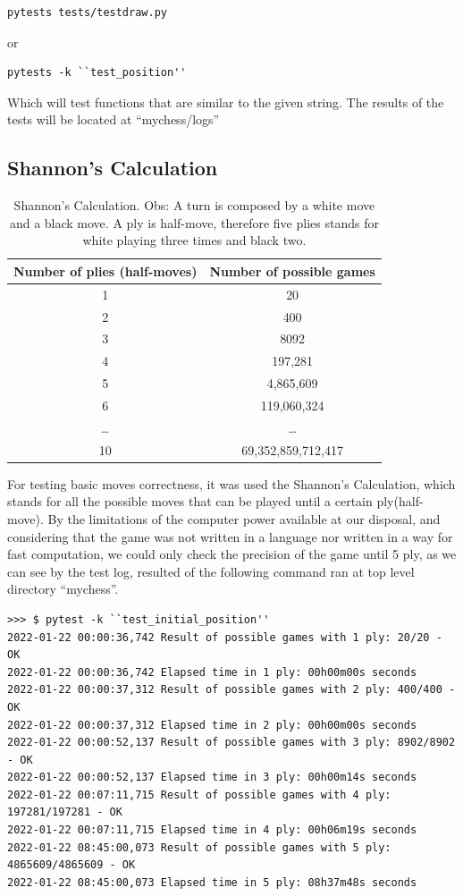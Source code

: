 \documentclass[10pt]{article}
\begin{document}
\begin{lstlisting}
pytests tests/testdraw.py
\end{lstlisting}

or 


\begin{lstlisting}
pytests -k ``test_position''
\end{lstlisting}

Which will test functions that are similar to the given string. The results
of the tests will be located at ``mychess/logs''


\subsection{Shannon's Calculation}


\begin{table}[H]
\center
\begin{tabular}{|c|c|}
\hline
\textbf{Number of plies (half-moves)}  & \textbf{Number of possible games}  \\
\hline
  1   & 20 \\
\hline
   2  &  400 \\
\hline
  3   & 8092 \\
\hline
4  & 197,281 \\
\hline
5   & 4,865,609 \\
\hline
6   & 119,060,324 \\
\hline
\ldots & \ldots \\
\hline
10 & 69,352,859,712,417 \\
\hline
\end{tabular}
\caption{Shannon's Calculation. Obs: A turn is composed by a white move and a
    black move. A ply is half-move, therefore five plies
stands for white playing three times and black two.}
\end{table}

For testing basic moves correctness, it was used the Shannon's Calculation,
which stands for all the possible moves that can be played until a certain
ply(half-move). By the limitations of the computer power available at our
disposal, and considering that the game was not written in a language nor
written in a way for fast computation, we could only check the precision of the
game until 5 ply, as we can see by the test log, resulted of the following
command ran at top level directory ``mychess''.
\begin{lstlisting}
>>> $ pytest -k ``test_initial_position''
2022-01-22 00:00:36,742 Result of possible games with 1 ply: 20/20 - OK
2022-01-22 00:00:36,742 Elapsed time in 1 ply: 00h00m00s seconds
2022-01-22 00:00:37,312 Result of possible games with 2 ply: 400/400 - OK
2022-01-22 00:00:37,312 Elapsed time in 2 ply: 00h00m00s seconds
2022-01-22 00:00:52,137 Result of possible games with 3 ply: 8902/8902 - OK
2022-01-22 00:00:52,137 Elapsed time in 3 ply: 00h00m14s seconds
2022-01-22 00:07:11,715 Result of possible games with 4 ply: 197281/197281 - OK
2022-01-22 00:07:11,715 Elapsed time in 4 ply: 00h06m19s seconds
2022-01-22 08:45:00,073 Result of possible games with 5 ply: 4865609/4865609 - OK
2022-01-22 08:45:00,073 Elapsed time in 5 ply: 08h37m48s seconds
    
\end{lstlisting}
\end{document}

